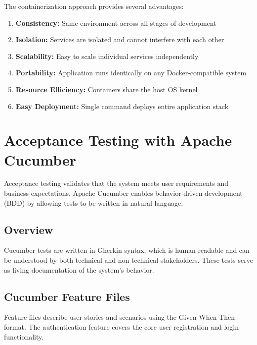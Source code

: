 \documentclass[12pt,a4paper]{article}
\begin{document}
The containerization approach provides several advantages:
\begin{enumerate}
    \item \textbf{Consistency:} Same environment across all stages of development
    \item \textbf{Isolation:} Services are isolated and cannot interfere with each other
    \item \textbf{Scalability:} Easy to scale individual services independently
    \item \textbf{Portability:} Application runs identically on any Docker-compatible system
    \item \textbf{Resource Efficiency:} Containers share the host OS kernel
    \item \textbf{Easy Deployment:} Single command deploys entire application stack
\end{enumerate}

\section{Acceptance Testing with Apache Cucumber}

Acceptance testing validates that the system meets user requirements and business expectations. Apache Cucumber enables behavior-driven development (BDD) by allowing tests to be written in natural language.

\subsection{Overview}

Cucumber tests are written in Gherkin syntax, which is human-readable and can be understood by both technical and non-technical stakeholders. These tests serve as living documentation of the system's behavior.

\subsection{Cucumber Feature Files}

Feature files describe user stories and scenarios using the Given-When-Then format. The authentication feature covers the core user registration and login functionality.
\end{document}
